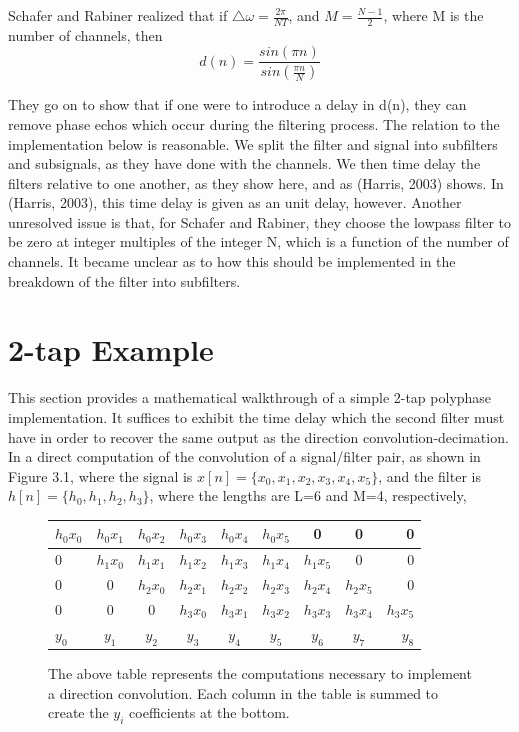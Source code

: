 \documentclass{report}
\begin{document}
Schafer and Rabiner realized that if $\triangle \omega = \frac{2\pi}{NT}$, and $M = \frac{N-1}{2}$, where M is the number of channels, then 
\begin{equation}
d(n) = \frac{sin(\pi n)}{sin(\frac{\pi n}{N})}
\end{equation}

They go on to show that if one were to introduce a delay in d(n), they can remove phase echos which occur during the filtering process.  The relation to the implementation below is reasonable.  We split the filter and signal into subfilters and subsignals, as they have done with the channels.  We then time delay the filters relative to one another, as they show here, and as (Harris, 2003) shows.  In (Harris, 2003), this time delay is given as an unit delay, however.  Another unresolved issue is that, for Schafer and Rabiner, they choose the lowpass filter to be zero at integer multiples of the integer N, which is a function of the number of channels.  It became unclear as to how this should be implemented in the breakdown of the filter into subfilters.
\section{2-tap Example}
This section provides a mathematical walkthrough of a simple 2-tap polyphase implementation.  It suffices to exhibit the time delay which the second filter must have in order to recover the same output as the direction convolution-decimation. 
In a direct computation of the convolution of a signal/filter pair, as shown in Figure 3.1, where the signal is $x[n] = \{x_0, x_1, x_2, x_3, x_4, x_5\}$, and the filter is $h[n] = \{h_0, h_1, h_2, h_3\}$, where the lengths are L=6 and M=4, respectively,
\bigskip
\begin{figure}[ht]
\begin{center}
  \begin{tabular}{ l|c|c|c|c|c|c|c|r }
    \hline
    $h_0 x_0$ & $h_0 x_1$ & $h_0 x_2$ & $h_0 x_3$ & $h_0 x_4$ & $h_0 x_5$ & 0 & 0 & 0\\ \hline
    0 & $h_1 x_0$ & $h_1 x_1$ & $h_1 x_2$ & $h_1 x_3$ & $h_1 x_4$ & $h_1 x_5$ & 0 & 0\\ \hline
    0 & 0 &$h_2 x_0$ & $h_2 x_1$ & $h_2 x_2$ & $h_2 x_3$ & $h_2 x_4$ & $h_2 x_5$ & 0\\ \hline
    0 & 0 & 0 &$h_3 x_0$ & $h_3 x_1$ & $h_3 x_2$ & $h_3 x_3$ & $h_3 x_4$ & $h_3 x_5$ \\\Xhline{1pt}
    $y_0$ & $y_1$ & $y_2$ & $y_3$ & $y_4$ & $y_5$ & $y_6$ & $y_7$ & $y_8$\\ \hline
  \end{tabular}
\end{center}
\caption{The above table represents the computations necessary to implement a direction convolution.  Each column in the table is summed to create the $y_i$ coefficients at the bottom.}
\end{figure}
\end{document}

